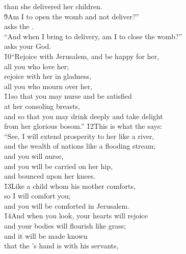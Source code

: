\begin{poetry}
\poemll    than she delivered her children. \\
\poeml \v{9}Am I to open the womb and not deliver?'' \\
\poemll    asks the . \\
\poeml ``And when I bring to delivery, am I to close the womb?'' \\
\poemll    asks your God. \\
\poeml \v{10}``Rejoice with Jerusalem, and be happy for her, \\
\poemll    all you who love her; \\
\poeml rejoice with her in gladness, \\
\poemll    all you who mourn over her, \\
\poeml \v{11}so that you may nurse and be satisfied \\
\poemll    at her consoling breasts, \\
\poeml and so that you may drink deeply and take delight \\
\poemll    from her glorious bosom.''
\poeml \v{12}This is what the  says: \\
\poeml ``See, I will extend prosperity to her like a river, \\
\poemll    and the wealth of nations like a flooding stream; \\
\poeml and you will nurse, \\
\poemll    and you will be carried on her hip, \\
\poemlll       and bounced upon her knees. \\
\poeml \v{13}Like a child whom his mother comforts, \\
\poemll    so I will comfort you; \\
\poemlll       and you will be comforted in Jerusalem. \\
\poeml \v{14}And when you look, your hearts will rejoice \\
\poemll    and your bodies will flourish like grass; \\
\poeml and it will be made known \\
\poemll    that the 's hand is with his servants, \\

\end{poetry}

